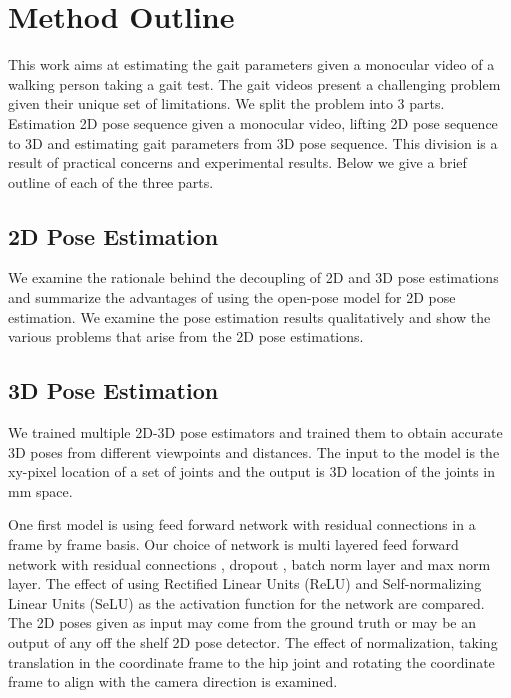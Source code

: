 \section{Method Outline}

This work aims at estimating the gait parameters given a monocular video of a walking person taking a gait test. The gait videos present a challenging problem given their unique set of limitations. We split the problem into 3 parts. Estimation 2D pose sequence given a monocular video, lifting 2D pose sequence to 3D and estimating gait parameters from 3D pose sequence. This division is a result of practical concerns and experimental results. Below we give a brief outline of each of the three parts.

\subsection{2D Pose Estimation}

We examine the rationale behind the decoupling of 2D and 3D pose estimations and summarize the advantages of using the open-pose \parencite{cao2016realtime} model for 2D pose estimation. We examine the pose estimation results qualitatively and show the various problems that arise from the 2D pose estimations.

\subsection{3D Pose Estimation}

We trained multiple 2D-3D pose estimators and trained them to obtain accurate 3D poses from different viewpoints and distances. The input to the model is the xy-pixel location of a set of joints and the output is 3D location of the joints in mm space.

One first model is using feed forward network with residual connections in a frame by frame basis. Our choice of network is multi layered feed forward network with residual connections \parencite{he2016deep}, dropout \parencite{srivastava2014dropout}, batch norm layer \parencite{ioffe2015batch} and max norm layer. The effect of using Rectified Linear Units (ReLU) \parencite{nair2010rectified} and Self-normalizing Linear Units (SeLU) \parencite{klambauer2017self} as the activation function for the network are compared. The 2D poses given as input may come from the ground truth or may be an output of any off the shelf 2D pose detector. The effect of normalization, taking translation in the coordinate frame to the hip joint and rotating the coordinate frame to align with the camera direction is examined. 

